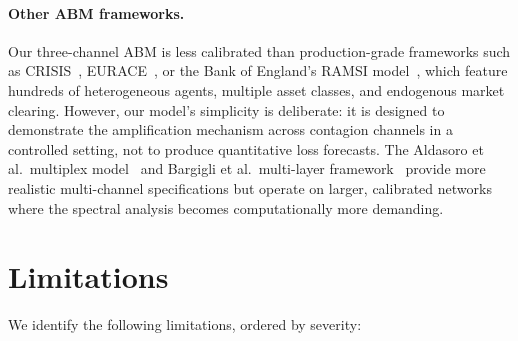 \paragraph{Other ABM frameworks.}
Our three-channel ABM is less calibrated than production-grade frameworks such as CRISIS~\cite{farmer2009economy}, EURACE~\cite{schweitzer2009economic}, or the Bank of England's RAMSI model~\cite{drehmann2013model}, which feature hundreds of heterogeneous agents, multiple asset classes, and endogenous market clearing. However, our model's simplicity is deliberate: it is designed to demonstrate the amplification mechanism across contagion channels in a controlled setting, not to produce quantitative loss forecasts. The Aldasoro et al.\ multiplex model~\cite{aldasoro2018multiplex} and Bargigli et al.\ multi-layer framework~\cite{bargigli2015multiplex} provide more realistic multi-channel specifications but operate on larger, calibrated networks where the spectral analysis becomes computationally more demanding.


\section{Limitations}
\label{sec:limitations}

We identify the following limitations, ordered by severity:

